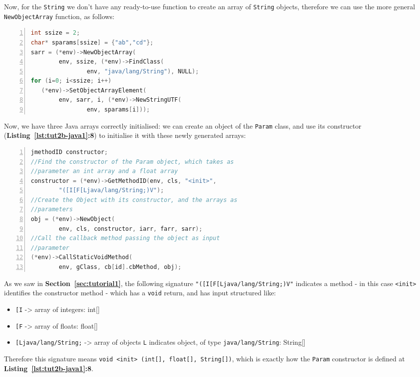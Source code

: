 \documentclass[a4paper,10pt]{article}
\newcommand{\keyword}[1]{\texttt{#1}}
\newcommand{\refl}[1]{\textbf{Listing~\ref{#1}}}
\newcommand{\refs}[1]{\textbf{Section~\ref{#1}}}
\begin{document}
\begin{multicols}{2}
\begin{lstlisting}[language=C,
		   columns=fullflexible,
		   showstringspaces=false,
		   xleftmargin=15pt,
		   frame = l,
		   numbers=left,
		   commentstyle=\color{gray}\upshape]
\end{lstlisting}
Now, for the \keyword{String} we don't have any ready-to-use function to create
an array of \keyword{String} objects, therefore we can use the more general
\keyword{NewObjectArray} function, as follows:
\begin{lstlisting}[language=C,
		   columns=fullflexible,
		   showstringspaces=false,
		   xleftmargin=15pt,
		   frame = l,
		   numbers=left,
		   commentstyle=\color{gray}\upshape]
int ssize = 2;
char* sparams[ssize] = {"ab","cd"};
sarr = (*env)->NewObjectArray(
		env, ssize, (*env)->FindClass(
				env, "java/lang/String"), NULL);
for (i=0; i<ssize; i++)
   (*env)->SetObjectArrayElement(
   		env, sarr, i, (*env)->NewStringUTF(
   				env, sparams[i]));
\end{lstlisting}
Now, we have three Java arrays correctly initialised: we can create an object
of the \keyword{Param} class, and use its constructor
(\refl{lst:tut2b-java1}\textbf{:8}) to initialise it with these newly
generated arrays:
\begin{lstlisting}[language=C,
		   columns=fullflexible,
		   showstringspaces=false,
		   xleftmargin=15pt,
		   frame = l,
		   numbers=left,
		   commentstyle=\color{gray}\upshape]
jmethodID constructor;
//Find the constructor of the Param object, which takes as
//parameter an int array and a float array
constructor = (*env)->GetMethodID(env, cls, "<init>",
		"([I[F[Ljava/lang/String;)V");
//Create the Object with its constructor, and the arrays as
//parameters
obj = (*env)->NewObject(
		env, cls, constructor, iarr, farr, sarr);
//Call the callback method passing the object as input
//parameter
(*env)->CallStaticVoidMethod(
		env, gClass, cb[id].cbMethod, obj);
\end{lstlisting}
As we saw in \refs{sec:tutorial1}, the following signature
\keyword{"([I[F[Ljava/lang/String;)V"} indicates a method - in this case
\keyword{<init>} identifies the constructor method - which has a \keyword{void}
return, and has input structured like:
\begin{itemize}
\item \keyword{[I} -> array of integers: int[]
\item \keyword{[F} -> array of floats: float[]
\item \keyword{[Ljava/lang/String;} -> array of objects \keyword{L} indicates
object, of type \keyword{java/lang/String}: String[]
\end{itemize}
Therefore this signature means \keyword{void <init> (int[], float[], String[])},
which is exactly how the \keyword{Param} constructor is defined at
\refl{lst:tut2b-java1}\textbf{:8}.


\end{multicols}
\end{document}

